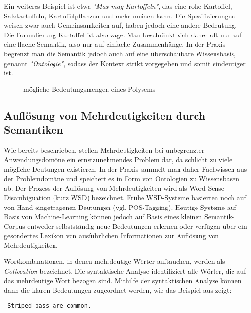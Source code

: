 \documentclass[12pt]{report}
\begin{document}
Ein weiteres Beispiel ist etwa \textit{"Max mag Kartoffeln"}, das eine rohe Kartoffel, Salzkartoffeln, Kartoffelpflanzen und mehr meinen kann. Die Spezifizierungen weisen zwar auch Gemeinsamkeiten auf, haben jedoch eine andere Bedeutung. Die Formulierung Kartoffel ist also vage.
Man beschränkt sich daher oft nur auf eine flache Semantik, also nur auf einfache Zusammenhänge. In der Praxis begrenzt man die Semantik jedoch auch auf eine überschaubare Wissensbasis, genannt \textit{"Ontologie"}, sodass der Kontext strikt vorgegeben und somit eindeutiger ist.

\begin{figure}
\caption{mögliche Bedeutungsmengen eines Polysems}
\end{figure}

\subsection{Auflösung von Mehrdeutigkeiten durch Semantiken}
Wie bereits beschrieben, stellen Mehrdeutigkeiten bei unbegrenzter Anwendungsdomöne ein ernstzunehmendes Problem dar, da schlicht zu viele mögliche Deutungen existieren. In der Praxis sammelt man daher Fachwissen aus der Problemdomäne und speichert es in Form von Ontologien zu Wissensbasen ab. Der Prozess der Auflösung von Mehrdeutigkeiten wird als Word-Sense-Disambiguation (kurz WSD) bezeichnet. Frühe WSD-Systeme basierten noch auf von Hand eingetragenen Deutungen (vgl. POS-Tagging). Heutige Systeme auf Basis von Machine-Learning können jedoch auf Basis eines kleinen Semantik-Corpus entweder selbstständig neue Bedeutungen erlernen oder verfügen über ein gesondertes Lexikon von ausführlichen Informationen zur Auflösung von Mehrdeutigkeiten. 

Wortkombinationen, in denen mehrdeutige Wörter auftauchen, werden als \textit{Collocation} bezeichnet. Die syntaktische Analyse identifiziert alle Wörter, die auf das mehrdeutige Wort bezogen sind. Mithilfe der syntaktischen Analyse können dann die klaren Bedeutungen zugeordnet werden, wie das Beispiel aus \cite{cop04} zeigt:

\tt
Striped bass are common.
\end{document}
